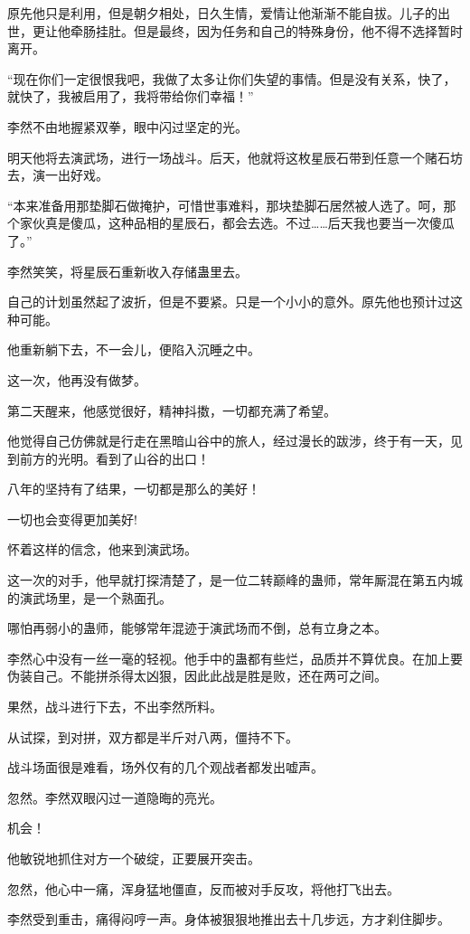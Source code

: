 \begin{this_body}
原先他只是利用，但是朝夕相处，日久生情，爱情让他渐渐不能自拔。儿子的出世，更让他牵肠挂肚。但是最终，因为任务和自己的特殊身份，他不得不选择暂时离开。

“现在你们一定很恨我吧，我做了太多让你们失望的事情。但是没有关系，快了，就快了，我被启用了，我将带给你们幸福！”

李然不由地握紧双拳，眼中闪过坚定的光。

明天他将去演武场，进行一场战斗。后天，他就将这枚星辰石带到任意一个赌石坊去，演一出好戏。

“本来准备用那垫脚石做掩护，可惜世事难料，那块垫脚石居然被人选了。呵，那个家伙真是傻瓜，这种品相的星辰石，都会去选。不过……后天我也要当一次傻瓜了。”

李然笑笑，将星辰石重新收入存储蛊里去。

自己的计划虽然起了波折，但是不要紧。只是一个小小的意外。原先他也预计过这种可能。

他重新躺下去，不一会儿，便陷入沉睡之中。

这一次，他再没有做梦。

第二天醒来，他感觉很好，精神抖擞，一切都充满了希望。

他觉得自己仿佛就是行走在黑暗山谷中的旅人，经过漫长的跋涉，终于有一天，见到前方的光明。看到了山谷的出口！

八年的坚持有了结果，一切都是那么的美好！

一切也会变得更加美好!

怀着这样的信念，他来到演武场。

这一次的对手，他早就打探清楚了，是一位二转巅峰的蛊师，常年厮混在第五内城的演武场里，是一个熟面孔。

哪怕再弱小的蛊师，能够常年混迹于演武场而不倒，总有立身之本。

李然心中没有一丝一毫的轻视。他手中的蛊都有些烂，品质并不算优良。在加上要伪装自己。不能拼杀得太凶狠，因此此战是胜是败，还在两可之间。

果然，战斗进行下去，不出李然所料。

从试探，到对拼，双方都是半斤对八两，僵持不下。

战斗场面很是难看，场外仅有的几个观战者都发出嘘声。

忽然。李然双眼闪过一道隐晦的亮光。

机会！

他敏锐地抓住对方一个破绽，正要展开突击。

忽然，他心中一痛，浑身猛地僵直，反而被对手反攻，将他打飞出去。

李然受到重击，痛得闷哼一声。身体被狠狠地推出去十几步远，方才刹住脚步。


\end{this_body}
